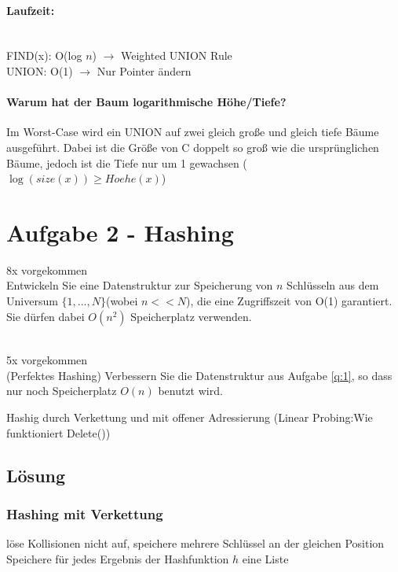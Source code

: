 \documentclass[10pt,a4paper]{article}
\begin{document}
\paragraph*{Laufzeit:}~\\
FIND(x): O(log $n$) $\rightarrow$ Weighted UNION Rule \\ 
UNION: O(1) $\rightarrow$ Nur Pointer ändern

\paragraph{Warum hat der Baum logarithmische Höhe/Tiefe?}
Im Worst-Case wird ein UNION auf zwei gleich große und gleich tiefe Bäume ausgeführt. Dabei ist die Größe von C doppelt so groß wie die ursprünglichen Bäume, jedoch ist die Tiefe nur um 1 gewachsen ($\log(size(x))\geq Hoehe(x)$)






\section*{Aufgabe 2 - Hashing}\label{q:1} 
8x vorgekommen \\
Entwickeln Sie eine Datenstruktur zur Speicherung von $n$ Schlüsseln aus dem Universum $\{1,...,N\}$(wobei $n<<N$), die eine Zugriffszeit von O(1) garantiert. Sie dürfen dabei $O(n^2)$ Speicherplatz verwenden.

~\\
5x vorgekommen \\
(Perfektes Hashing) Verbessern Sie die Datenstruktur aus Aufgabe \ref{q:1}, so dass nur noch Speicherplatz $O(n)$ benutzt wird.

Hashig durch Verkettung und mit offener Adressierung (Linear Probing:Wie funktioniert Delete())

\subsection*{Lösung}
\subsubsection*{Hashing mit Verkettung} löse Kollisionen nicht auf, speichere mehrere Schlüssel an der gleichen Position
\\

Speichere für jedes Ergebnis der Hashfunktion $h$ eine Liste
\end{document}
